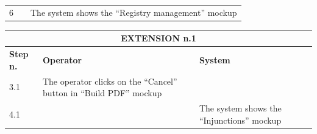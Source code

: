 {{{\begin{table}[h]
\begin{tabular}{|p{2cm}|p{6cm}|p{6cm}|}
				\vspace{1mm} \vspace{1mm} \\
			\hline
				\vspace{1mm} 6\vspace{1mm} &
				\vspace{1mm} \vspace{1mm} & 
				\vspace{1mm} The system shows the “Registry management” mockup\vspace{1mm} \\
			\hline
			\end{tabular}
			\end{table}
			
			\begin{table}[h]
			\begin{tabular}{|p{2cm}|p{6cm}|p{6cm}|}
			\hline
				\multicolumn{3}{|c|}{EXTENSION n.1}\\
			\hline
				\centering \vspace{1mm} \bfseries{Step n.} \vspace{1mm} & \vspace{1mm} \bfseries{Operator} \vspace{1mm} & \vspace{1mm} \bfseries{System} \vspace{1mm}\\
			\hline
				\vspace{1mm} 3.1\vspace{1mm} &
				\vspace{1mm} The operator clicks on the “Cancel” button in “Build PDF” mockup \vspace{1mm} & 
				\vspace{1mm} \vspace{1mm} \\
			\hline
				\vspace{1mm} 4.1\vspace{1mm} &
				\vspace{1mm} \vspace{1mm} & 
				\vspace{1mm} The system shows the “Injunctions” mockup\vspace{1mm} \\
			\hline
			\end{tabular}
			\end{table}
			\begin{table}[h]
			\begin{tabular}{|p{2cm}|p{6cm}|p{6cm}|}
			\hline

\end{tabular}
\end{table}}}}
